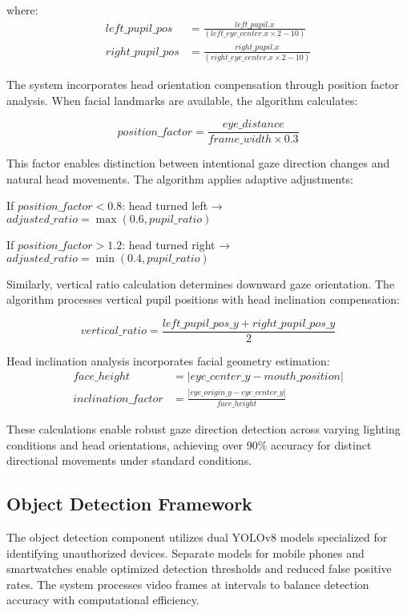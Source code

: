 \documentclass[conference]{IEEEtran}
\begin{document}
where:
\begin{align}
left\_pupil\_pos &= \frac{left\_pupil.x}{(left\_eye\_center.x \times 2 - 10)} \\
right\_pupil\_pos &= \frac{right\_pupil.x}{(right\_eye\_center.x \times 2 - 10)}
\end{align}

The system incorporates head orientation compensation through position factor analysis. When facial landmarks are available, the algorithm calculates:

\begin{equation}
position\_factor = \frac{eye\_distance}{frame\_width \times 0.3}
\end{equation}

This factor enables distinction between intentional gaze direction changes and natural head movements. The algorithm applies adaptive adjustments:

If $position\_factor < 0.8$: head turned left → $adjusted\_ratio = \max(0.6, pupil\_ratio)$  

If $position\_factor > 1.2$: head turned right → $adjusted\_ratio = \min(0.4, pupil\_ratio)$

Similarly, vertical ratio calculation determines downward gaze orientation. The algorithm processes vertical pupil positions with head inclination compensation:

\begin{equation}
vertical\_ratio = \frac{left\_pupil\_pos\_y + right\_pupil\_pos\_y}{2}
\end{equation}

Head inclination analysis incorporates facial geometry estimation:
\begin{align}
face\_height &= |eye\_center\_y - mouth\_position| \\
inclination\_factor &= \frac{|eye\_origin\_y - eye\_center\_y|}{face\_height}
\end{align}

These calculations enable robust gaze direction detection across varying lighting conditions and head orientations, achieving over 90\% accuracy for distinct directional movements under standard conditions.

\subsection{Object Detection Framework}

The object detection component utilizes dual YOLOv8 models specialized for identifying unauthorized devices. Separate models for mobile phones and smartwatches enable optimized detection thresholds and reduced false positive rates. The system processes video frames at intervals to balance detection accuracy with computational efficiency.
\end{document}
